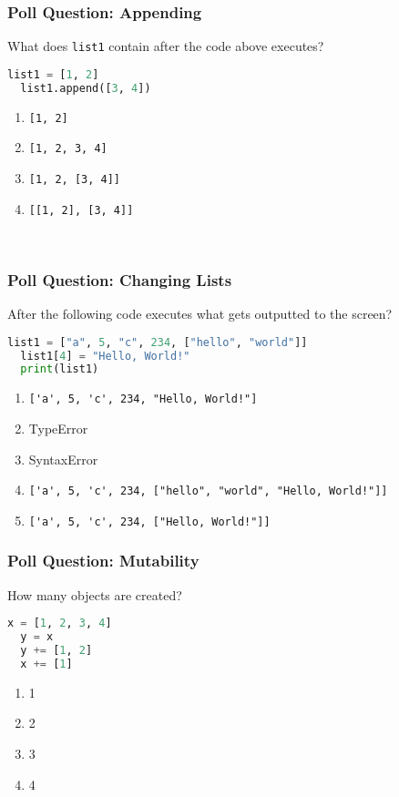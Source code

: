 \documentclass{beamer}
\begin{document}
%
%
\begin{frame}[fragile]
  \frametitle{Poll Question: Appending}
  What does \lstinline|list1| contain after the code above executes?
  \begin{lstlisting}[language=Python, autogobble]
  list1 = [1, 2]
  list1.append([3, 4])
  \end{lstlisting}
  \vfill
  \begin{enumerate}[A] 
    \item \lstinline|[1, 2]|
    \item \lstinline|[1, 2, 3, 4]|
    \item \lstinline|[1, 2, [3, 4]]| %
    \item \lstinline|[[1, 2], [3, 4]]|
  \end{enumerate}
  \
\end{frame}


%
%
\begin{frame}[fragile]
  \frametitle{Poll Question: Changing Lists}
  After the following code executes what gets outputted to the screen?
  \begin{lstlisting}[language=Python, autogobble]
  list1 = ["a", 5, "c", 234, ["hello", "world"]]
  list1[4] = "Hello, World!"
  print(list1)
  \end{lstlisting}
  \vfill
  \begin{enumerate}[A] 
    \item \lstinline|['a', 5, 'c', 234, "Hello, World!"]| %
    \item TypeError
    \item SyntaxError
    \item \lstinline|['a', 5, 'c', 234, ["hello", "world", "Hello, World!"]]|
    \item \lstinline|['a', 5, 'c', 234, ["Hello, World!"]]|
  \end{enumerate}
\end{frame}

%
%
\begin{frame}[fragile]
  \frametitle{Poll Question: Mutability} 
  How many objects are created?
  \begin{lstlisting}[language=Python, autogobble]
  x = [1, 2, 3, 4]
  y = x
  y += [1, 2]
  x += [1]
  \end{lstlisting}
  \vfill
  \begin{enumerate}[A] 
    \item 1
    \item 2
    \item 3
    \item 4
  \end{enumerate}
\end{frame}
\end{document}
